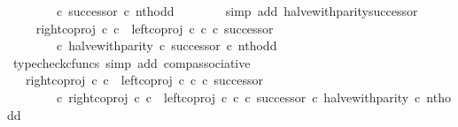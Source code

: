 \begin{isabellebody}
\ \ \ \ \ \ \ \ {\isasymcirc}\isactrlsub c\ successor{\isacharparenright}{\kern0pt}\ {\isasymcirc}\isactrlsub c\ nth{\isacharunderscore}{\kern0pt}odd{\isachardoublequoteclose}\isanewline
\ \ \ \ \ \ \isamarkupfalse%
\ {\isacharparenleft}{\kern0pt}simp\ add{\isacharcolon}{\kern0pt}\ halve{\isacharunderscore}{\kern0pt}with{\isacharunderscore}{\kern0pt}parity{\isacharunderscore}{\kern0pt}successor{\isacharparenright}{\kern0pt}\isanewline
\ \ \ \ \isamarkupfalse%
\ \isamarkupfalse%
\ {\isachardoublequoteopen}{\isachardot}{\kern0pt}{\isachardot}{\kern0pt}{\isachardot}{\kern0pt}\ {\isacharequal}{\kern0pt}\ {\isacharparenleft}{\kern0pt}right{\isacharunderscore}{\kern0pt}coproj\ {\isasymnat}\isactrlsub c\ {\isasymnat}\isactrlsub c\ {\isasymamalg}\ {\isacharparenleft}{\kern0pt}left{\isacharunderscore}{\kern0pt}coproj\ {\isasymnat}\isactrlsub c\ {\isasymnat}\isactrlsub c\ {\isasymcirc}\isactrlsub c\ successor{\isacharparenright}{\kern0pt}\isanewline
\ \ \ \ \ \ \ \ {\isasymcirc}\isactrlsub c\ {\isacharparenleft}{\kern0pt}halve{\isacharunderscore}{\kern0pt}with{\isacharunderscore}{\kern0pt}parity\ {\isasymcirc}\isactrlsub c\ successor{\isacharparenright}{\kern0pt}{\isacharparenright}{\kern0pt}\ {\isasymcirc}\isactrlsub c\ nth{\isacharunderscore}{\kern0pt}odd{\isachardoublequoteclose}\isanewline
\ \ \ \ \ \ \isamarkupfalse%
\ {\isacharparenleft}{\kern0pt}typecheck{\isacharunderscore}{\kern0pt}cfuncs{\isacharcomma}{\kern0pt}\ simp\ add{\isacharcolon}{\kern0pt}\ comp{\isacharunderscore}{\kern0pt}associative{}{\isacharparenright}{\kern0pt}\isanewline
\ \ \ \ \isamarkupfalse%
\ \isamarkupfalse%
\ {\isachardoublequoteopen}{\isachardot}{\kern0pt}{\isachardot}{\kern0pt}{\isachardot}{\kern0pt}\ {\isacharequal}{\kern0pt}\ {\isacharparenleft}{\kern0pt}right{\isacharunderscore}{\kern0pt}coproj\ {\isasymnat}\isactrlsub c\ {\isasymnat}\isactrlsub c\ {\isasymamalg}\ {\isacharparenleft}{\kern0pt}left{\isacharunderscore}{\kern0pt}coproj\ {\isasymnat}\isactrlsub c\ {\isasymnat}\isactrlsub c\ {\isasymcirc}\isactrlsub c\ successor{\isacharparenright}{\kern0pt}\isanewline
\ \ \ \ \ \ \ \ {\isasymcirc}\isactrlsub c\ {\isacharparenleft}{\kern0pt}right{\isacharunderscore}{\kern0pt}coproj\ {\isasymnat}\isactrlsub c\ {\isasymnat}\isactrlsub c\ {\isasymamalg}\ {\isacharparenleft}{\kern0pt}left{\isacharunderscore}{\kern0pt}coproj\ {\isasymnat}\isactrlsub c\ {\isasymnat}\isactrlsub c\ {\isasymcirc}\isactrlsub c\ successor{\isacharparenright}{\kern0pt}\ {\isasymcirc}\isactrlsub c\ halve{\isacharunderscore}{\kern0pt}with{\isacharunderscore}{\kern0pt}parity{\isacharparenright}{\kern0pt}{\isacharparenright}{\kern0pt}\ {\isasymcirc}\isactrlsub c\ nth{\isacharunderscore}{\kern0pt}odd{\isachardoublequoteclose}\isanewline

\end{isabellebody}
